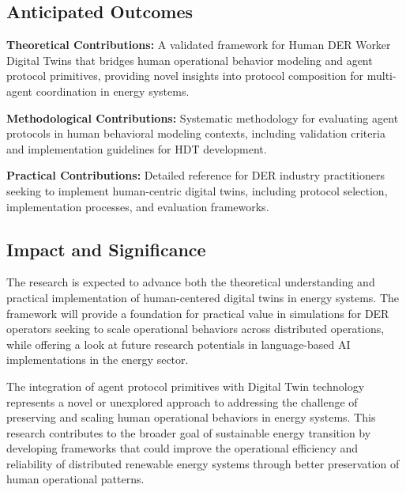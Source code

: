 \documentclass[12pt,a4paper]{article}
\begin{document}
\subsection{Anticipated Outcomes}

\noindent \textbf{Theoretical Contributions:} A validated framework for Human DER Worker Digital Twins that bridges human operational behavior modeling and agent protocol primitives, providing novel insights into protocol composition for multi-agent coordination in energy systems.

\noindent \textbf{Methodological Contributions:} Systematic methodology for evaluating agent protocols in human behavioral modeling contexts, including validation criteria and implementation guidelines for HDT development.

\noindent \textbf{Practical Contributions:} Detailed reference for DER industry practitioners seeking to implement human-centric digital twins, including protocol selection, implementation processes, and evaluation frameworks.

\subsection{Impact and Significance}

The research is expected to advance both the theoretical understanding and practical implementation of human-centered digital twins in energy systems. The framework will provide a foundation for practical value in simulations for DER operators seeking to scale operational behaviors across distributed operations, while offering a look at future research potentials in language-based AI implementations in the energy sector.

The integration of agent protocol primitives with Digital Twin technology represents a novel or unexplored approach to addressing the challenge of preserving and scaling human operational behaviors in energy systems. This research contributes to the broader goal of sustainable energy transition by developing frameworks that could improve the operational efficiency and reliability of distributed renewable energy systems through better preservation of human operational patterns.

\clearpage

\printbibliography
\end{document}

